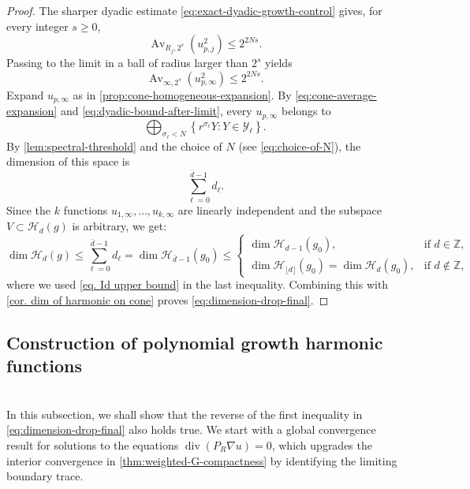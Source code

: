 \documentclass[12pt]{amsart}
\theoremstyle{plain}
\theoremstyle{definition}
\theoremstyle{remark}     %
\numberwithin{equation}{section}
\begin{document}
\begin{proof}
The sharper dyadic estimate
\cref{eq:exact-dyadic-growth-control} gives, for every integer $s\geq0$,
\[
    \operatorname{Av}_{R_j,2^s}(u_{p,j}^2)
    \leq2^{2Ns}.
\]
Passing to the limit in a ball of radius larger than $2^s$ yields
\begin{equation}\label{eq:dyadic-bound-after-limit}
    \operatorname{Av}_{\infty,2^s}(u_{p,\infty}^2)
    \leq2^{2Ns}.
\end{equation}
Expand $u_{p,\infty}$ as in
\cref{prop:cone-homogeneous-expansion}.  
By \cref{eq:cone-average-expansion} and \cref{eq:dyadic-bound-after-limit}, 
 every $u_{p,\infty}$ belongs to
\[
    \bigoplus_{\sigma_\ell<N}
    \left\{r^{\sigma_\ell}Y:Y\in\mathcal Y_\ell\right\}.
\]
By \cref{lem:spectral-threshold} and the choice of $N$ (see \cref{eq:choice-of-N}), the dimension of this space is
\[
    \sum_{\ell=0}^{\bar{d}-1}d_\ell.
\]
Since the $k$ functions $u_{1,\infty},\ldots , u_{k,\infty}$ are linearly independent and the subspace $V\subset \mathcal H_d(g) $ is arbitrary, we get:
\[
    \dim\mathcal H_d(g)
    \leq\sum_{\ell=0}^{\bar{d}-1}d_\ell
    =\dim\mathcal H_{\bar{d}-1}(g_0)
    \leq 
    \begin{cases}
        \dim\mathcal H_{d-1}(g_0), &\text{if }
        d\in\mathbb{Z},\\
        \dim\mathcal H_{\lfloor d\rfloor}(g_0)
        =\dim\mathcal H_{d}(g_0),
        &\text{if }
        d\not\in\mathbb{Z},
    \end{cases}
\]
where we used \cref{eq. Id upper bound} in the last inequality. Combining this with \cref{cor. dim of harmonic on cone} proves \cref{eq:dimension-drop-final}.
\end{proof}

\subsection{Construction of polynomial growth harmonic functions}
\ \\
In this subsection, we shall show that the reverse of the first inequality in \cref{eq:dimension-drop-final} also holds true. We start with a global convergence result for solutions to the equations $\operatorname{div}(P_R\nabla u)=0$, which upgrades the interior convergence in \cref{thm:weighted-G-compactness} by identifying the limiting boundary trace.
\end{document}
